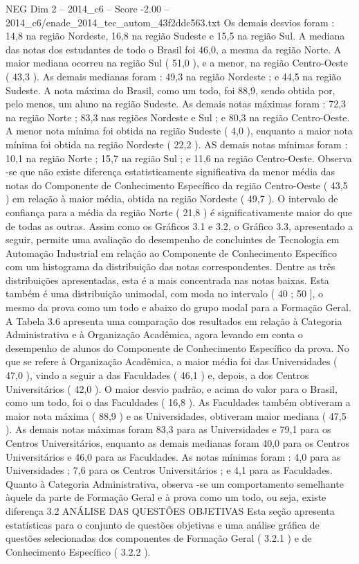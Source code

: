\begin{textsample}{NEG Dim 2 – 2014\_c6 – Score -2.00 – 2014\_c6/enade\_2014\_tec\_autom\_43f2ddc563.txt}
Os demais desvios foram : 14,8 na região Nordeste, 16,8 na região Sudeste e 15,5 na região Sul.
A mediana das notas dos estudantes de todo o Brasil foi 46,0, a mesma da região Norte.
A maior mediana ocorreu na região Sul ( 51,0 ), e a menor, na região Centro-Oeste ( 43,3 ).
As demais medianas foram : 49,3 na região Nordeste ; e 44,5 na região Sudeste.
A nota máxima do Brasil, como um todo, foi 88,9, sendo obtida por, pelo menos, um aluno na região Sudeste.
As demais notas máximas foram : 72,3 na região Norte ; 83,3 nas regiões Nordeste e Sul ; e 80,3 na região Centro-Oeste.
A menor nota mínima foi obtida na região Sudeste ( 4,0 ), enquanto a maior nota mínima foi obtida na região Nordeste ( 22,2 ).
AS demais notas mínimas foram : 10,1 na região Norte ; 15,7 na região Sul ; e 11,6 na região Centro-Oeste.
Observa -se que não existe diferença estatisticamente significativa da menor média das notas do Componente de Conhecimento Específico da região Centro-Oeste ( 43,5 ) em relação à maior média, obtida na região Nordeste ( 49,7 ).
O intervalo de confiança para a média da região Norte ( 21,8 ) é significativamente maior do que de todas as outras.
Assim como os Gráficos 3.1 e 3.2, o Gráfico 3.3, apresentado a seguir, permite uma avaliação do desempenho de concluintes de Tecnologia em Automação Industrial em relação ao Componente de Conhecimento Específico com um histograma da distribuição das notas correspondentes.
Dentre as três distribuições apresentadas, esta é a mais concentrada nas notas baixas.
Esta também é uma distribuição unimodal, com moda no intervalo ( 40 ; 50 ], o mesmo da prova como um todo e abaixo do grupo modal para a Formação Geral.
A Tabela 3.6 apresenta uma comparação dos resultados em relação à Categoria Administrativa e à Organização Acadêmica, agora levando em conta o desempenho de alunos do Componente de Conhecimento Específico da prova.
No que se refere à Organização Acadêmica, a maior média foi das Universidades ( 47,0 ), vindo a seguir a das Faculdades ( 46,1 ) e, depois, a dos Centros Universitários ( 42,0 ).
O maior desvio padrão, e acima do valor para o Brasil, como um todo, foi o das Faculdades ( 16,8 ).
As Faculdades também obtiveram a maior nota máxima ( 88,9 ) e as Universidades, obtiveram maior mediana ( 47,5 ).
As demais notas máximas foram 83,3 para as Universidades e 79,1 para os Centros Universitários, enquanto as demais medianas foram 40,0 para os Centros Universitários e 46,0 para as Faculdades.
As notas mínimas foram : 4,0 para as Universidades ; 7,6 para os Centros Universitários ; e 4,1 para as Faculdades.
Quanto à Categoria Administrativa, observa -se um comportamento semelhante àquele da parte de Formação Geral e à prova como um todo, ou seja, existe diferença 3.2 ANÁLISE DAS QUESTÕES OBJETIVAS Esta seção apresenta estatísticas para o conjunto de questões objetivas e uma análise gráfica de questões selecionadas dos componentes de Formação Geral ( 3.2.1 ) e de Conhecimento Específico ( 3.2.2 ).

\end{textsample}
